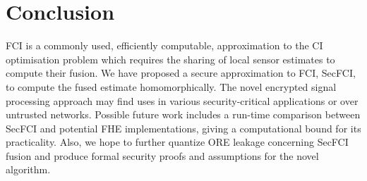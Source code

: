 \documentclass[letterpaper, 10 pt, conference]{ieeeconf}  %
\begin{document}



\section{Conclusion} \label{sec:conclusion}
FCI is a commonly used, efficiently computable, approximation to the CI optimisation problem which requires the sharing of local sensor estimates to compute their fusion. We have proposed a secure approximation to FCI, SecFCI, to compute the fused estimate homomorphically. The novel encrypted signal processing approach may find uses in various security-critical applications or over untrusted networks. Possible future work includes a run-time comparison between SecFCI and potential FHE implementations, giving a computational bound for its practicality. Also, we hope to further quantize ORE leakage concerning SecFCI fusion and produce formal security proofs and assumptions for the novel algorithm.



\end{document}
